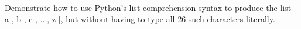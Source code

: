  \label{sssec:ex1_19}

Demonstrate how to use Python's list comprehension syntax to produce the list [ a , b , c , ..., z ], but without having to type all 26 such characters literally.


